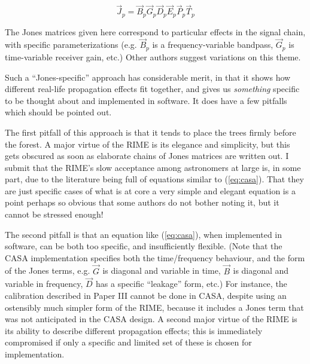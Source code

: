 \documentclass{aa}
\newcommand{\jones}[2]{\vec {#1}_{#2}}
\begin{document}
\begin{equation}\label{eq:casa}
\jones{J}{p} = \jones{B}{p} \jones{G}{p} \jones{D}{p} \jones{E}{p} \jones{P}{p} \vec  T_p
\end{equation}

The Jones matrices given here correspond to particular effects in the signal chain, with specific parameterizations (e.g. $\jones{B}{p}$ is a frequency-variable bandpass, $\jones{G}{p}$ is time-variable receiver gain, etc.) Other authors \citep{Rau:DDEs} suggest variations on this theme. 

Such a ``Jones-specific'' approach has considerable merit, in that it shows how different real-life propagation effects fit together, and gives us {\em something} specific to be thought about and implemented in software. It does have a few pitfalls which should be pointed out.

The first pitfall of this approach is that it tends to place the trees firmly before the forest. A major virtue of the RIME is its elegance and simplicity, but this gets obscured as soon as elaborate chains of Jones matrices are written out.  I submit that the RIME's slow acceptance among astronomers at large is, in some part, due to the literature being full of equations similar to (\ref{eq:casa}). That they are just specific cases of what is at core a very simple and elegant equation is a point perhaps so obvious that some authors do not bother noting it, but it cannot be stressed enough!

The second pitfall is that an equation like (\ref{eq:casa}), when implemented in software, can be both too specific, and insufficiently flexible. (Note that the CASA implementation specifies both the time/frequency behaviour, and the form of the Jones terms, e.g. $\jones{G}{}$ is diagonal and variable in time, $\jones{B}{}$ is diagonal and variable in frequency,
$\jones{D}{}$ has a specific ``leakage'' form, etc.) For instance, the calibration described in Paper III \citep{RRIME3} cannot be done in CASA, despite using an ostensibly much simpler form of the RIME, because it includes a Jones term that was not anticipated in the CASA design. A second major virtue of the RIME is its ability to describe different propagation effects; this is immediately compromised if only a specific and limited set of these is chosen for implementation.
\end{document}
